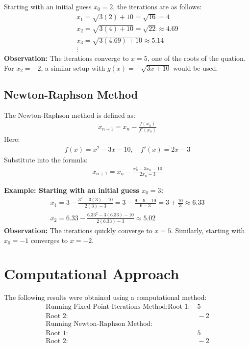 \documentclass[journal]{IEEEtran}
\begin{document}
Starting with an initial guess \( x_0 = 2 \), the iterations are as follows:
\begin{align}
    x_1 = \sqrt{3(2) + 10} = \sqrt{16} = 4 \\
    x_2 = \sqrt{3(4) + 10} = \sqrt{22} \approx 4.69 \\
    x_3 = \sqrt{3(4.69) + 10} \approx 5.14 \\
    \vdots
\end{align}
\textbf{Observation:} The iterations converge to \( x = 5 \), one of the roots of the quation. For \( x_2 = -2 \), a similar setup with \( g(x) = -\sqrt{3x + 10} \) would be used.

\subsection*{ Newton-Raphson Method}
The Newton-Raphson method is defined as:
\begin{align}
    x_{n+1} = x_n - \frac{f(x_n)}{f'(x_n)}
\end{align}
Here:
\begin{align}
    f(x) = x^2 - 3x - 10, \quad f'(x) = 2x - 3
\end{align}
Substitute into the formula:
\begin{align}
    x_{n+1} = x_n - \frac{x_n^2 - 3x_n - 10}{2x_n - 3}
\end{align}

\textbf{Example: Starting with an initial guess \( x_0 = 3 \):}
\begin{align}
    x_1 = 3 - \frac{3^2 - 3(3) - 10}{2(3) - 3} = 3 - \frac{9 - 9 - 10}{6 - 3} = 3 + \frac{10}{3} \approx 6.33 \\
    x_2 = 6.33 - \frac{6.33^2 - 3(6.33) - 10}{2(6.33) - 3} \approx 5.02
\end{align}
\textbf{Observation:} The iterations quickly converge to \( x = 5 \). Similarly, starting with \( x_0 = -1 \) converges to \( x = -2 \).

\section*{Computational Approach}
The following results were obtained using a computational method:
\begin{align*}
\text{Running Fixed Point Iterations Method:} 
\text{Root 1:} & \; 5 \\
\text{Root 2:} & \; -2 \\
\text{Running Newton-Raphson Method:} & \\
\text{Root 1:} & \; 5 \\
\text{Root 2:} & \; -2
\end{align*}
\end{document}

